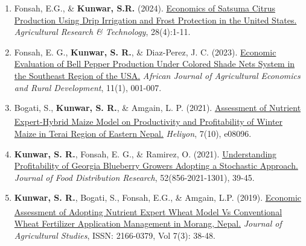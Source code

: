 \begin{enumerate}[leftmargin = 1.5em, start = 4]
\item Fonsah, E.G., \& \textbf{Kunwar, S.R.} (2024). \href{https://juniperpublishers.com/artoaj/pdf/ARTOAJ.MS.ID.556416.pdf}{Economics of Satsuma Citrus Production Using Drip Irrigation and Frost Protection in the United States.} \textit{Agricultural Research \& Technology}, 28(4):1-11.

\item Fonsah, E. G., \textbf{Kunwar, S. R.}, \& Diaz-Perez, J. C. (2023). \href{https://internationalscholarsjournals.org/articles/7533205004012023}{Economic Evaluation of Bell Pepper Production Under Colored Shade Nets System in the Southeast Region of the USA.} \textit{African Journal of Agricultural Economics and Rural Development}, 11(1), 001-007.
    
\item Bogati, S., \textbf{Kunwar, S. R.}, \& Amgain, L. P. (2021). \href{https://doi.org/10.1016/j.heliyon.2021.e08096}{Assessment of Nutrient Expert\textsuperscript{\textregistered}-Hybrid Maize Model on Productivity and Profitability of Winter Maize in Terai Region of Eastern Nepal.} \textit{Heliyon}, 7(10), e08096.

\item \textbf{Kunwar, S. R.}, Fonsah, E. G., \& Ramirez, O. (2021). \href{https://doi.org/10.22004/ag.econ.313450}{Understanding Profitability of Georgia Blueberry Growers Adopting a Stochastic Approach.} \textit{Journal of Food Distribution Research}, 52(856-2021-1301), 39-45.
    
\item \textbf{Kunwar, S. R.}, Bogati, S., Fonsah, E.G., \& Amgain, L.P. (2019). \href{https://doi.org/10.5296/jas.v7i3.14900}{Economic Assessment of Adopting Nutrient Expert\textsuperscript{\textregistered} Wheat Model Vs Conventional Wheat Fertilizer Application Management in Morang, Nepal.} \textit{Journal of Agricultural Studies}, ISSN: 2166-0379, Vol 7(3): 38-48.

\end{enumerate}